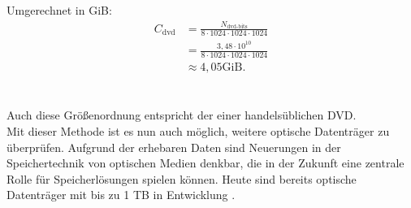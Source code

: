 \documentclass[9pt,twocolumn,twoside]{pnas-new}
\begin{document}
Umgerechnet in GiB:
\begin{align*}
C_{\mbox{dvd}} &= \frac{N_{\mbox{dvd-bits}}}{8\cdot1024\cdot1024\cdot1024}\\
&= \frac{3,48\cdot10^{10}}{8\cdot1024\cdot1024\cdot1024}\\
&\approx 4,05\mbox{GiB}.
\end{align*}
\\\\
Auch diese Größenordnung entspricht der einer handelsüblichen DVD.\\
Mit dieser Methode ist es nun auch möglich, weitere optische Datenträger zu überprüfen.
Aufgrund der erhebaren Daten sind Neuerungen in der Speichertechnik von optischen Medien denkbar, die in der Zukunft eine zentrale Rolle für Speicherlösungen spielen können. Heute sind bereits optische Datenträger mit bis zu 1 TB in Entwicklung \cite{SonyPressStatement}.
\\

\end{document}
